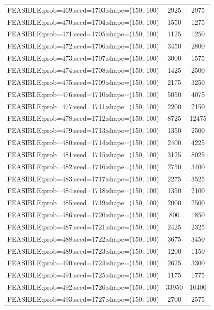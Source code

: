 \begin{longtable}{lcc}
FEASIBLE:prob=469:seed=1703:shape=(150, 100) &     2925 &  2975 \\
FEASIBLE:prob=470:seed=1704:shape=(150, 100) &     1550 &  1275 \\
FEASIBLE:prob=471:seed=1705:shape=(150, 100) &     1125 &  1250 \\
FEASIBLE:prob=472:seed=1706:shape=(150, 100) &     3450 &  2800 \\
FEASIBLE:prob=473:seed=1707:shape=(150, 100) &     3000 &  1575 \\
FEASIBLE:prob=474:seed=1708:shape=(150, 100) &     1425 &  2500 \\
FEASIBLE:prob=475:seed=1709:shape=(150, 100) &     2175 &  3250 \\
FEASIBLE:prob=476:seed=1710:shape=(150, 100) &     5050 &  4075 \\
FEASIBLE:prob=477:seed=1711:shape=(150, 100) &     2200 &  2150 \\
FEASIBLE:prob=478:seed=1712:shape=(150, 100) &     8725 & 12475 \\
FEASIBLE:prob=479:seed=1713:shape=(150, 100) &     1350 &  2500 \\
FEASIBLE:prob=480:seed=1714:shape=(150, 100) &     2400 &  4225 \\
FEASIBLE:prob=481:seed=1715:shape=(150, 100) &     3125 &  8025 \\
FEASIBLE:prob=482:seed=1716:shape=(150, 100) &     2750 &  3400 \\
FEASIBLE:prob=483:seed=1717:shape=(150, 100) &     2275 &  3525 \\
FEASIBLE:prob=484:seed=1718:shape=(150, 100) &     1350 &  2100 \\
FEASIBLE:prob=485:seed=1719:shape=(150, 100) &     2000 &  2500 \\
FEASIBLE:prob=486:seed=1720:shape=(150, 100) &      800 &  1850 \\
FEASIBLE:prob=487:seed=1721:shape=(150, 100) &     2425 &  2325 \\
FEASIBLE:prob=488:seed=1722:shape=(150, 100) &     3675 &  3450 \\
FEASIBLE:prob=489:seed=1723:shape=(150, 100) &     1200 &  1150 \\
FEASIBLE:prob=490:seed=1724:shape=(150, 100) &     2625 &  3300 \\
FEASIBLE:prob=491:seed=1725:shape=(150, 100) &     1175 &  1775 \\
FEASIBLE:prob=492:seed=1726:shape=(150, 100) &    33950 & 10400 \\
FEASIBLE:prob=493:seed=1727:shape=(150, 100) &     2700 &  2575 \\

\end{longtable}
